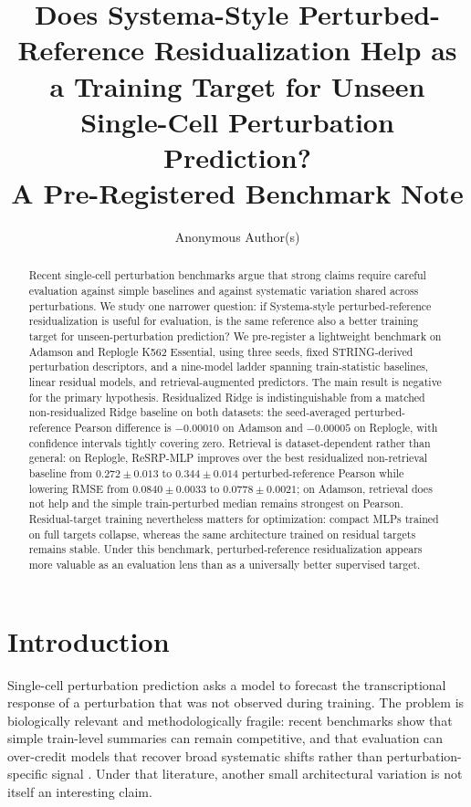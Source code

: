 \documentclass{article}
\title{Does Systema-Style Perturbed-Reference Residualization Help as a Training Target for Unseen Single-Cell Perturbation Prediction?\\A Pre-Registered Benchmark Note}
\author{Anonymous Author(s)}
\begin{document}
\maketitle

\begin{abstract}
Recent single-cell perturbation benchmarks argue that strong claims require careful evaluation against simple baselines and against systematic variation shared across perturbations. We study one narrower question: if Systema-style perturbed-reference residualization is useful for evaluation, is the same reference also a better training target for unseen-perturbation prediction? We pre-register a lightweight benchmark on Adamson and Replogle K562 Essential, using three seeds, fixed STRING-derived perturbation descriptors, and a nine-model ladder spanning train-statistic baselines, linear residual models, and retrieval-augmented predictors. The main result is negative for the primary hypothesis. Residualized Ridge is indistinguishable from a matched non-residualized Ridge baseline on both datasets: the seed-averaged perturbed-reference Pearson difference is $-0.00010$ on Adamson and $-0.00005$ on Replogle, with confidence intervals tightly covering zero. Retrieval is dataset-dependent rather than general: on Replogle, ReSRP-MLP improves over the best residualized non-retrieval baseline from $0.272 \pm 0.013$ to $0.344 \pm 0.014$ perturbed-reference Pearson while lowering RMSE from $0.0840 \pm 0.0033$ to $0.0778 \pm 0.0021$; on Adamson, retrieval does not help and the simple train-perturbed median remains strongest on Pearson. Residual-target training nevertheless matters for optimization: compact MLPs trained on full targets collapse, whereas the same architecture trained on residual targets remains stable. Under this benchmark, perturbed-reference residualization appears more valuable as an evaluation lens than as a universally better supervised target.
\end{abstract}

\section{Introduction}

Single-cell perturbation prediction asks a model to forecast the transcriptional response of a perturbation that was not observed during training. The problem is biologically relevant and methodologically fragile: recent benchmarks show that simple train-level summaries can remain competitive, and that evaluation can over-credit models that recover broad systematic shifts rather than perturbation-specific signal \citep{kernfeld2025expressionforecasting, vinastorne2025systema, wei2026benchmarking, csendes2025benchmarking}. Under that literature, another small architectural variation is not itself an interesting claim.
\end{document}

